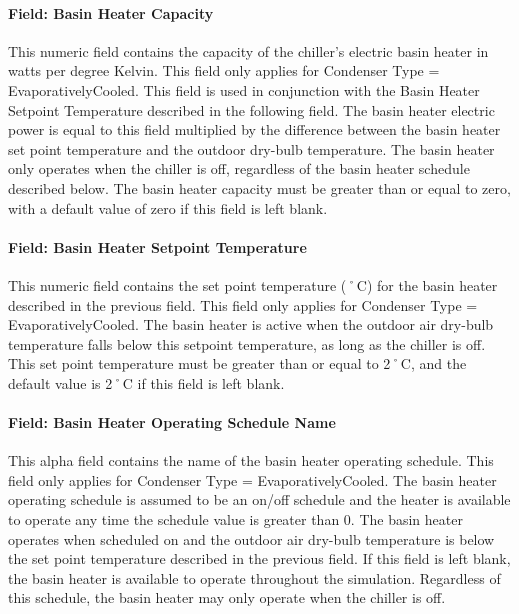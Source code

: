 \paragraph{Field: Basin Heater Capacity}\label{field-basin-heater-capacity-4-000}

This numeric field contains the capacity of the chiller's electric basin heater in watts per degree Kelvin. This field only applies for Condenser Type = EvaporativelyCooled. This field is used in conjunction with the Basin Heater Setpoint Temperature described in the following field. The basin heater electric power is equal to this field multiplied by the difference between the basin heater set point temperature and the outdoor dry-bulb temperature. The basin heater only operates when the chiller is off, regardless of the basin heater schedule described below. The basin heater capacity must be greater than or equal to zero, with a default value of zero if this field is left blank.

\paragraph{Field: Basin Heater Setpoint Temperature}\label{field-basin-heater-setpoint-temperature-4-000}

This numeric field contains the set point temperature (˚C) for the basin heater described in the previous field. This field only applies for Condenser Type = EvaporativelyCooled. The basin heater is active when the outdoor air dry-bulb temperature falls below this setpoint temperature, as long as the chiller is off. This set point temperature must be greater than or equal to 2˚C, and the default value is 2˚C if this field is left blank.

\paragraph{Field: Basin Heater Operating Schedule Name}\label{field-basin-heater-operating-schedule-name-4-000}

This alpha field contains the name of the basin heater operating schedule. This field only applies for Condenser Type = EvaporativelyCooled. The basin heater operating schedule is assumed to be an on/off schedule and the heater is available to operate any time the schedule value is greater than 0. The basin heater operates when scheduled on and the outdoor air dry-bulb temperature is below the set point temperature described in the previous field. If this field is left blank, the basin heater is available to operate throughout the simulation. Regardless of this schedule, the basin heater may only operate when the chiller is off.

